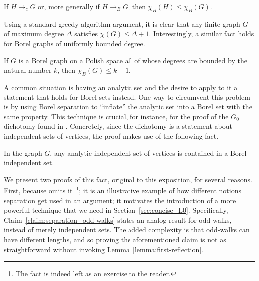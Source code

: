 \begin{fact}\label{fact:chrom_transitive}
    If $H\to_cG$ or, more generally if $H\to_BG$, then $\chi_B(H)\leq\chi_B(G)$.
\end{fact}

Using a standard greedy algorithm argument, it is clear that any finite graph $G$ of maximum degree $\Delta$ satisfies $\chi(G)\leq\Delta+1$.
Interestingly, a similar fact holds for Borel graphs of uniformly bounded degree.

\begin{theorem}\label{prop:brooks}
    If $G$ is a Borel graph on a Polish space all of whose degrees are bounded by the natural number $k$, then $\chi_B(G)\leq k+1$.
\end{theorem}

A common situation is having an analytic set and the desire to apply to it a statement that holds for Borel sets instead.
One way to circumvent this problem is by using Borel separation to ``inflate'' the analytic set into a Borel set with the same property.
This technique is crucial, for instance, for the proof of the $G_0$ dichotomy found in \cite{Bernshteyn2024}.
Concretely, since the dichotomy is a statement about independent sets of vertices, the proof makes use of the following fact.

\begin{proposition}
    In the graph $G$, any analytic independent set of vertices is contained in a Borel independent set.
\end{proposition}

We present two proofs of this fact, original to this exposition, for several reasons.
First, because \cite{Bernshteyn2024} omits it~\footnote{The fact is indeed left as an exercise to the reader.}; it is an illustrative example of how different notions separation get used in an argument; it motivates the introduction of a more powerful technique that we need in Section~\ref{sec:concise_L0}.
Specifically, Claim~\ref{claim:separation_odd-walks} states an analog result for odd-walks, instead of merely independent sets.
The added complexity is that odd-walks can have different lengths, and so proving the aforementioned claim is not as straightforward without invoking Lemma~\ref{lemma:first-reflection}.


